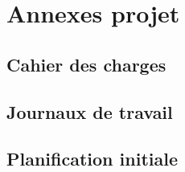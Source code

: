 \documentclass[french]{article}
\begin{document}
	\newpage
		
		
	\section{Annexes projet}
		\subsection{Cahier des charges}
			
		\subsection{Journaux de travail}
			
		\subsection{Planification initiale}
				
				
				
				
				
				
\end{document}

